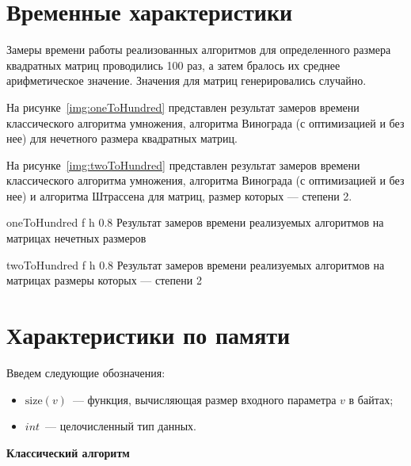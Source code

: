 \section{Временные характеристики}

Замеры времени работы реализованных алгоритмов для определенного размера квадратных матриц проводились 100 раз, а затем бралось их среднее арифметическое значение. 
Значения для матриц генерировались случайно.

На рисунке~\ref{img:oneToHundred} представлен результат замеров времени классического алгоритма умножения, алгоритма Винограда (с оптимизацией и без нее) для нечетного размера квадратных матриц.

На рисунке~\ref{img:twoToHundred} представлен результат замеров времени классического алгоритма умножения, алгоритма Винограда (с оптимизацией и без нее) и алгоритма Штрассена для матриц, размер которых --- степени 2.

	{oneToHundred} %
	{f} %
	{h} %
	{0.8\textwidth} %
	{Результат замеров времени реализуемых алгоритмов на матрицах нечетных размеров} %
	
	{twoToHundred} %
	{f} %
	{h} %
	{0.8\textwidth} %
	{Результат замеров времени реализуемых алгоритмов на матрицах размеры которых --- степени 2} %
	
\clearpage	

\section{Характеристики по памяти}

Введем следующие обозначения:

\begin{itemize}
	\item $\text{size}(v)$~--- функция, вычисляющая размер входного параметра $v$ в байтах;
	\item $int$~--- целочисленный тип данных.
\end{itemize}

\textbf{Классический алгоритм}

